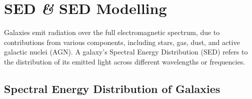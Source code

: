 \chapter{SED \textit{\&} SED Modelling}\label{chp:SED}
\captionsetup{width=0.75\textwidth}

Galaxies emit radiation over the full electromagnetic spectrum, due to contributions from various components, including stars, gas, dust, and active galactic nuclei (AGN). A galaxy's Spectral Energy Distribution (SED) refers to the distribution of its emitted light across different wavelengths or frequencies.

\section{Spectral Energy Distribution of Galaxies} \label{sec:SED}

